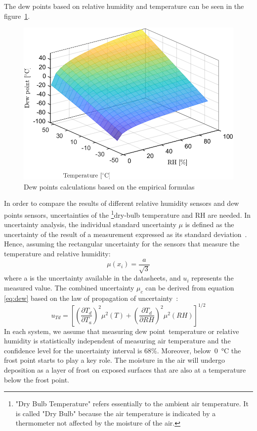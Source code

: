 The dew points based on relative humidity and temperature can be seen in the figure~\ref{fig:dewpointmagnus}.
\begin{figure}[!h]
\centering
\includegraphics[width=0.65\columnwidth]{Chapter5/images/dewpointmagnus.png}
\caption{Dew points calculations based on the empirical formulas}
\label{fig:dewpointmagnus}
\end{figure}
In order to compare the results of different relative humidity sensors and dew points sensors, uncertainties of the \footnote{"Dry Bulb Temperature" refers essentially to the ambient air temperature. It is called "Dry Bulb" because the air temperature is indicated by a thermometer not affected by the moisture of the air.}{dry-bulb} temperature and \gls{RH} are needed. In uncertainty analysis, the individual standard uncertainty $\mu$ is defined as the uncertainty of the result of a measurement expressed as its standard deviation~\cite{NIST_1994}. Hence, assuming the rectangular uncertainty for the sensors that measure the temperature and relative humidity:
\begin{equation}
    \mu(x_{i}) = \frac{a}{\sqrt{3}}
\end{equation}
where a is the uncertainty available in the datasheets, and $u_{i}$ represents the measured value. The combined uncertainty $\mu_{c}$ can be derived from equation \ref{eq:dew} based on the law of propagation of uncertainty~\cite{dp_uncertainty}:
\begin{equation}
    u_{Td} = \left [  \left (\frac{\partial T_{d}}{\partial T_{a}}  \right )^{2} \mu^{2}(T) + \left (\frac{\partial T_{d}}{\partial RH}  \right )^{2} \mu^{2}(RH)\right ]^{1/2}
    \label{dp_error}
\end{equation}
In each system, we assume that measuring dew point temperature or relative humidity is statistically independent of measuring air temperature and the confidence level for the uncertainty interval is 68\%.  Moreover, below~\SI{0}{\celsius} the frost point starts to play a key role. The moisture in the air will undergo deposition as a layer of frost on exposed surfaces that are also at a temperature below the frost point. 

